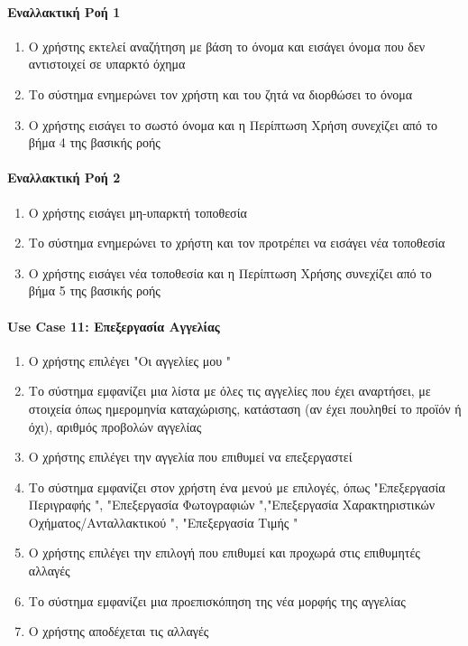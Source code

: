 \documentclass{../ol-softwaremanual}
\begin{document}
	\paragraph{Εναλλακτική Ροή 1}
	\begin{enumerate}
		\item  Ο χρήστης εκτελεί αναζήτηση με βάση το όνομα και εισάγει όνομα που δεν αντιστοιχεί σε υπαρκτό όχημα
		\item Το σύστημα ενημερώνει τον χρήστη και του ζητά να διορθώσει το όνομα
		\item Ο χρήστης εισάγει το σωστό όνομα και η Περίπτωση Χρήση συνεχίζει από το βήμα 4 της βασικής ροής		 
	\end{enumerate}
	
	\paragraph{Εναλλακτική Ροή 2}
	\begin{enumerate}
		\item Ο χρήστης εισάγει μη-υπαρκτή τοποθεσία
		\item Το σύστημα ενημερώνει το χρήστη και τον προτρέπει να εισάγει νέα τοποθεσία 
		\item Ο χρήστης εισάγει νέα τοποθεσία και η Περίπτωση Χρήσης συνεχίζει από το βήμα 5 της βασικής ροής
	\end{enumerate}
	
	
	
	
	\paragraph{\en Use Case 11: \gr Επεξεργασία Αγγελίας \gr}
	
	\begin{enumerate}
		\item Ο χρήστης επιλέγει \en"\gr Οι αγγελίες μου \en"\gr
		\item Το σύστημα εμφανίζει μια λίστα με όλες τις αγγελίες που έχει αναρτήσει, με στοιχεία όπως ημερομηνία καταχώρισης, κατάσταση (αν έχει πουληθεί το προϊόν ή όχι), αριθμός προβολών αγγελίας
		\item Ο χρήστης επιλέγει την αγγελία που επιθυμεί να επεξεργαστεί
		\item Το σύστημα εμφανίζει στον χρήστη ένα μενού με επιλογές, όπως \en"\gr Επεξεργασία Περιγραφής \en"\gr , \en"\gr Επεξεργασία Φωτογραφιών \en"\gr,\en"\gr Επεξεργασία Χαρακτηριστικών Οχήματος/Ανταλλακτικού \en"\gr, \en"\gr Επεξεργασία Τιμής \en"\gr
		\item Ο χρήστης επιλέγει την επιλογή που επιθυμεί και προχωρά στις επιθυμητές αλλαγές
		\item Το σύστημα εμφανίζει μια προεπισκόπηση της νέα μορφής της αγγελίας
		\item Ο χρήστης αποδέχεται τις αλλαγές
	\end{enumerate}
	
\end{document}
